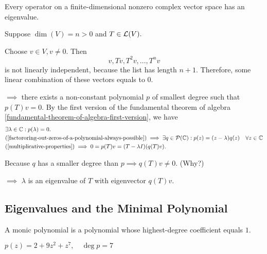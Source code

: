 \begin{thm} 
  \label{thm: existence of eigenvalues}
  Every operator on a finite-dimensional nonzero complex vector space has an eigenvalue.
\end{thm}
\begin{prf}
  Suppose $\dim(V)=n>0$ and $T\in \mathcal{L}(V).$ 
  
  Choose $v\in V, v\neq0$. Then 
  \begin{equation}
    v, Tv, T^2v, \dots, T^nv
  \end{equation} 
  is not linearly independent, 
  because the list has length $n+1$. Therefore, some linear combination of these vectors equals to $0$. 
  
  $\implies$ there exists a non-constant polynomial $p$ of smallest degree such that $p(T)v = 0$. By the first version of the fundamental theorem of algebra \ref{fundamental-theorem-of-algebra-first-version}, we have 
  \begin{equation}
    \begin{aligned}
      &\exists \lambda \in \mathbb{C}: p(\lambda) = 0. \\  
      &\text{(\ref{factororing-out-zeros-of-a-polynomial-always-possible})}
      \implies \exists q \in \mathcal {P} (\mathbb{C}): p(z) = (z-\lambda)  q(z) \quad \forall z \in \mathbb{C} \\
      &\text{(\ref{multiplicative-properties})} \implies 0=p(T)v=(T-\lambda I) (q(T)v).
    \end{aligned} 
  \end{equation}
  
  Because $q$ has a smaller degree than $p \implies q(T)v \neq 0$. (Why?) 
  
  $\implies$ $\lambda$ is an eigenvalue of $T$ with eigenvector $q(T)v$.
  
\end{prf}

\subsection{Eigenvalues and the Minimal Polynomial}
\begin{mydef} 
  A monic polynomial is a polynomial whose highest-degree coefficient equals $1$.
\end{mydef}
\begin{example}
  $p(z)=2+9z^2+z^7, \quad \deg p = 7$
\end{example}

